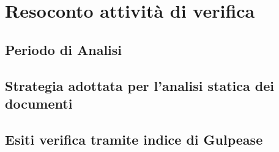 \section{Resoconto attività di verifica}
\subsection{Periodo di Analisi}
\subsection{Strategia adottata per l'analisi statica dei documenti}
\subsection{Esiti verifica tramite indice di Gulpease}


